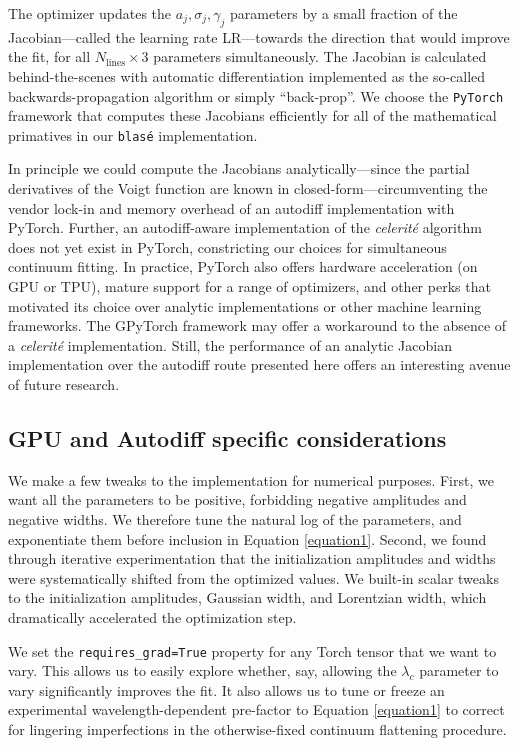 \documentclass[modern]{aastex631}
\begin{document}
The optimizer updates the $a_j, \sigma_j, \gamma_j$ parameters by a small fraction of the Jacobian---called the learning rate LR---towards the direction that would improve the fit, for all $N_{\mathrm{lines}} \times 3$ parameters simultaneously.  The Jacobian is calculated behind-the-scenes with automatic differentiation implemented as the so-called backwards-propagation algorithm or simply ``back-prop''.  We choose the \texttt{PyTorch} framework that computes these Jacobians efficiently for all of the mathematical primatives in our \texttt{blas\'e} implementation.

In principle we could compute the Jacobians analytically---since the partial derivatives of the Voigt function are known in closed-form---circumventing the vendor lock-in and memory overhead of an autodiff implementation with PyTorch.  Further, an autodiff-aware implementation of the \emph{celerit\'e} algorithm does not yet exist in PyTorch, constricting our choices for simultaneous continuum fitting.  In practice, PyTorch also offers hardware acceleration (on GPU or TPU), mature support for a range of optimizers, and other perks that motivated its choice over analytic implementations or other machine learning frameworks.  The GPyTorch framework may offer a workaround to the absence of a \emph{celerit\'e} implementation.  Still, the performance of an analytic Jacobian implementation over the autodiff route presented here offers an interesting avenue of future research.

\subsection{GPU and Autodiff specific considerations}
We make a few tweaks to the implementation for numerical purposes.  First, we want all the parameters to be positive, forbidding negative amplitudes and negative widths.  We therefore tune the natural log of the parameters, and exponentiate them before inclusion in Equation \ref{equation1}.  Second, we found through iterative experimentation that the initialization amplitudes and widths were systematically shifted from the optimized values.  We built-in scalar tweaks to the initialization amplitudes, Gaussian width, and Lorentzian width, which dramatically accelerated the optimization step.

We set the \texttt{requires\_grad=True} property for any Torch tensor that we want to vary.  This allows us to easily explore whether, say, allowing the $\lambda_c$ parameter to vary significantly improves the fit.  It also allows us to tune or freeze an experimental wavelength-dependent pre-factor to Equation \ref{equation1} to correct for lingering imperfections in the otherwise-fixed continuum flattening procedure.
\end{document}
